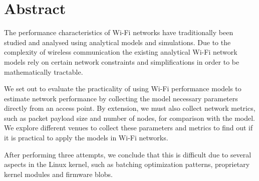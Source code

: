 
\chapter*{Abstract}

The performance characteristics of Wi-Fi networks have traditionally been
studied and analysed using analytical models and simulations. Due to the
complexity of wireless communication the existing analytical Wi-Fi network
models rely on certain network constraints and simplifications in order to be
mathematically tractable.

We set out to evaluate the practicality of using Wi-Fi performance models to 
estimate network performance by collecting the model necessary parameters directly 
from an access point. By extension, we must also collect network metrics,
such as packet payload size and number of nodes, for comparison with the model. We 
explore different venues to collect these parameters and metrics to find out
if it is practical to apply the models in Wi-Fi networks. 

After performing three attempts, we conclude that this is difficult due to several
 aspects in the Linux kernel, such as batching optimization patterns, proprietary 
 kernel modules and firmware blobs. 
